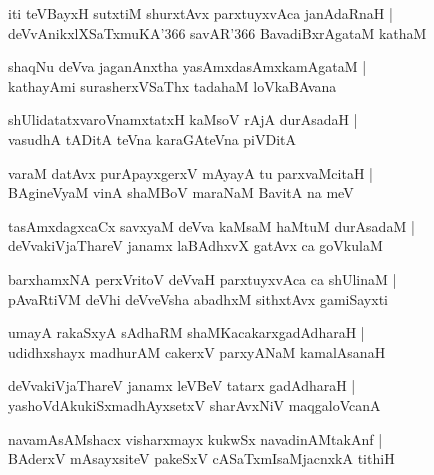 \begin{shloka}
iti teVBayxH sutxtiM shurxtAvx parxtuyxvAca janAdaRnaH |\\
deVvAnikxlXSaTxmuKA\char'366 savAR\char'366 BavadiBxrAgataM kathaM
\end{shloka}

\begin{shloka}
shaqNu deVva jaganAnxtha yasAmxdasAmxkamAgataM |\\
kathayAmi surasherxVSaThx tadahaM loVkaBAvana
\end{shloka}

\begin{shloka}
shUlidatatxvaroVnamxtatxH kaMsoV rAjA durAsadaH |\\
vasudhA tADitA teVna karaGAteVna piVDitA
\end{shloka}

\begin{shloka}
varaM datAvx purApayxgerxV mAyayA tu parxvaMcitaH |\\
BAgineVyaM vinA shaMBoV maraNaM BavitA na meV 
\end{shloka}

\begin{shloka}
tasAmxdagxcaCx savxyaM deVva kaMsaM haMtuM durAsadaM |\\
deVvakiVjaThareV janamx laBAdhxvX gatAvx ca goVkulaM
\end{shloka}

\begin{shloka}
barxhamxNA perxVritoV deVvaH parxtuyxvAca ca shUlinaM |\\
pAvaRtiVM deVhi deVveVsha abadhxM sithxtAvx gamiSayxti
\end{shloka}

\begin{shloka}
umayA rakaSxyA sAdhaRM shaMKacakarxgadAdharaH |\\
udidhxshayx madhurAM cakerxV parxyANaM kamalAsanaH 
\end{shloka}

\begin{shloka}
deVvakiVjaThareV janamx leVBeV tatarx gadAdharaH |\\
yashoVdAkukiSxmadhAyxsetxV sharAvxNiV maqgaloVcanA 
\end{shloka}

\begin{shloka}
navamAsAMshacx visharxmayx kukwSx navadinAMtakAnf |\\
BAderxV mAsayxsiteV pakeSxV cASaTxmIsaMjacnxkA tithiH
\end{shloka}

